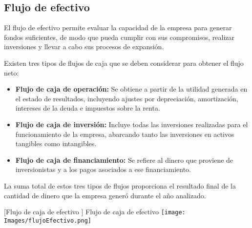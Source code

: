 \subsection{Flujo de efectivo}

El flujo de efectivo permite evaluar la capacidad de la empresa para generar fondos suficientes, de modo que pueda cumplir con sus compromisos, realizar inversiones y llevar a cabo sus procesos de expansión.

Existen tres tipos de flujos de caja que se deben considerar para obtener el flujo neto:

\begin{itemize}
    \item \textbf{Flujo de caja de operación: } Se obtiene a partir de la utilidad generada en el estado de resultados, incluyendo ajustes por depreciación, amortización, intereses de la deuda e impuestos sobre la renta.
    \item \textbf{Flujo de caja de inversión: } Incluye todas las inversiones realizadas para el funcionamiento de la empresa, abarcando tanto las inversiones en activos tangibles como intangibles.
    \item \textbf{Flujo de caja de financiamiento: } Se refiere al dinero que proviene de inversionistas y a los pagos asociados a ese financiamiento.
\end{itemize}

La suma total de estos tres tipos de flujos proporciona el resultado final de la cantidad de dinero que la empresa generó durante el año analizado.

\vspace{2mm}
\begin{minipage}{0.8\textwidth}
\centering
{}[{Flujo de caja de efectivo }]{ Flujo de caja de efectivo}
\label{flujoOperacional}
\texttt{[image: Images/flujoEfectivo.png]}
\end{minipage}
